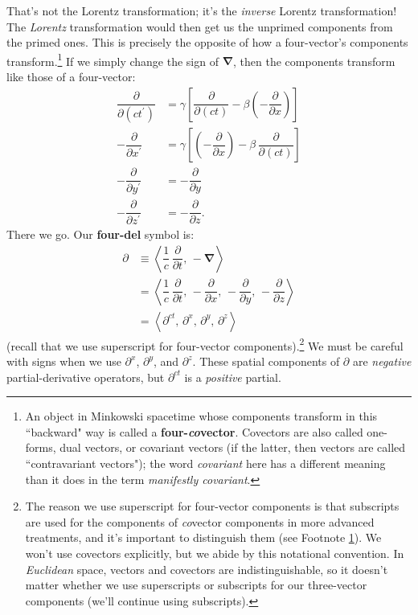 \documentclass[12pt]{article}
\newcommand{\del}{\boldsymbol{\nabla}}
\begin{document}
That's not the Lorentz transformation; it's the \emph{inverse} Lorentz transformation! The \emph{Lorentz} transformation would then get us the unprimed components from the primed ones. This is precisely the opposite of how a four-vector's components transform.\footnote{\label{fn:cv}An object in Minkowski spacetime whose components transform in this ``backward" way is called a \textbf{four-\emph{co}vector}. Covectors are also called one-forms, dual vectors, or covariant vectors (if the latter, then vectors are called ``contravariant vectors"); the word \emph{covariant} here has a different meaning than it does in the term \emph{manifestly covariant}.} If we simply change the sign of $\del$, then the components transform like those of a four-vector:
\begin{equation*}
\begin{split}
\dfrac{\partial}{\partial (ct^\prime)} &= \gamma \left[ \dfrac{\partial}{\partial (ct)} - \beta \left(- \dfrac{\partial}{\partial x} \right) \right] \\[3pt]
- \dfrac{\partial}{\partial x^\prime} &= \gamma \left[ \left( - \dfrac{\partial}{\partial x} \right) - \beta \, \dfrac{\partial}{\partial (ct)}  \right] \\[3pt]
- \dfrac{\partial}{\partial y^\prime} &= - \dfrac{\partial}{\partial y} \\[3pt]
- \dfrac{\partial}{\partial z^\prime} &= - \dfrac{\partial}{\partial z} .
\end{split}
\end{equation*}
There we go. Our \textbf{four-del} symbol is:
\begin{equation}\label{eq:fn}
\boxed{
\begin{aligned}
\partialup &\equiv \left \langle \dfrac{1}{c} \, \dfrac{\partial}{\partial t} , \, - \del \right \rangle \\[3pt]
&= \left \langle \dfrac{1}{c} \, \dfrac{\partial}{\partial t} , \, - \dfrac{\partial}{\partial x}, \, - \dfrac{\partial}{\partial y}, \, - \dfrac{\partial}{\partial z} \right \rangle \\[3pt]
&=  \left \langle \partial^{ct}, \, \partial^x , \, \partial^y , \, \partial^z \right \rangle
\end{aligned}
}
\end{equation}
(recall that we use superscript for four-vector components).\footnote{The reason we use superscript for four-vector components is that subscripts are used for the components of \emph{co}vector components in more advanced treatments, and it's important to distinguish them (see Footnote \ref{fn:cv}). We won't use covectors explicitly, but we abide by this notational convention. In \emph{Euclidean} space, vectors and covectors are indistinguishable, so it doesn't matter whether we use superscripts or subscripts for our three-vector components (we'll continue using subscripts).} We must be careful with signs when we use $\partial^x$, $\partial^y$, and $\partial^z$. These spatial components of $\partialup$ are \emph{negative} partial-derivative operators, but $\partial^{ct}$ is a \emph{positive} partial.
\end{document}
